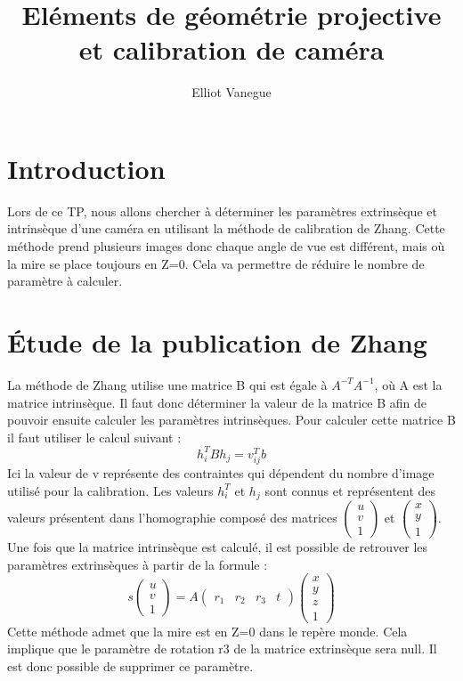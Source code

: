 \documentclass[a4paper,10pt]{article}
\title{Eléments de géométrie projective et calibration de caméra}
\author{Elliot Vanegue}
\begin{document}
\maketitle

\section{Introduction}
Lors de ce TP, nous allons chercher à déterminer les paramètres extrinsèque et 
intrinsèque d'une caméra en utilisant la méthode de calibration de Zhang.
Cette méthode prend plusieurs images donc chaque angle de vue est différent, mais
où la mire se place toujours en Z=0. Cela va permettre de réduire le nombre de paramètre
à calculer.

\section{Étude de la publication de Zhang}

La méthode de Zhang utilise une matrice B qui est égale à $A^{-T}A^{-1}$, où A est la matrice
intrinsèque. Il faut donc déterminer la valeur de la matrice B afin de pouvoir ensuite 
calculer les paramètres intrinsèques. Pour calculer cette matrice B il faut utiliser le
calcul suivant : 
\begin{equation}
 h^T_iBh_j=v^T_{ij}b
\end{equation}
Ici la valeur de v représente des contraintes qui dépendent du nombre d'image utilisé pour 
la calibration. Les valeurs $h^T_i$ et $h_j$ sont connus et représentent des valeurs présentent
dans l'homographie composé des matrices $\begin{pmatrix}u\\v\\1\end{pmatrix}$ et $\begin{pmatrix}x\\y\\1\end{pmatrix}$.
Une fois que la matrice intrinsèque est calculé, il
est possible de retrouver les paramètres extrinsèques à partir de la formule :
\begin{equation}
 s\begin{pmatrix}u\\v\\1\end{pmatrix} = A\begin{pmatrix}r_1&r_2&r_3&t\end{pmatrix}\begin{pmatrix}x\\y\\z\\1\end{pmatrix}
\end{equation}
Cette méthode admet que la mire est en Z=0 dans le repère monde. Cela
implique que le paramètre de rotation r3 de la matrice extrinsèque sera null. Il est donc
possible de supprimer ce paramètre.\\
\end{document}
